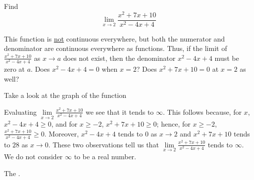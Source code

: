 \documentclass{ximera}
\begin{document}
\begin{question}
  Find 
  \[
  \displaystyle \lim_{x\to 2} \frac{x^2+7x+10}{x^2-4x+4}
  \]
  \begin{solution}
    \begin{hint}
     This function is \underline{not} continuous everywhere, but both the numerator and denominator are continuous everywhere as functions. Thus, if the limit of $\frac{x^2+7x+10}{x^2-4x+4}$ as $x\to{a}$ does not exist, then the denominator $x^2-4x+4$ must be zero at $a$. Does $x^2-4x+4=0$ when $x=2$? Does $x^2+7x+10=0$ at $x=2$ as well?
    \end{hint}
     \begin{hint}
    	Take a look at the graph of the function
    \begin{center}
      \end{center} 
    \end{hint}
    \begin{hint}
     Evaluating $\lim\limits_{x\to2}\frac{x^2+7x+10}{x^2-4x+4}$ we see that it tends to $\infty$. This follows because, for $x$, $x^2-4x+4\ge0$, and for $x\ge-2$, $x^2+7x+10\ge0$; hence, for $x\ge-2$, $\frac{x^2+7x+10}{x^2-4x+4}\ge0$. Moreover, $x^2-4x+4$ tends to $0$ as $x\to{2}$ and $x^2+7x+10$ tends to $28$ as $x\to{0}$. These two observations tell us that  $\lim\limits_{x\to2}\frac{x^2+7x+10}{x^2-4x+4}$ tends to $\infty$. We do not consider $\infty$ to be a real number.
    \end{hint}
     The 
    .
  \end{solution}
\end{question}
\end{document}
